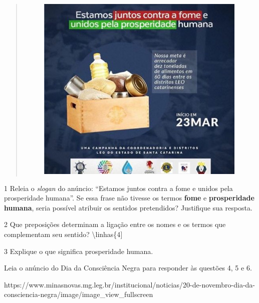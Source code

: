 \begin{itemize}
\begin{itemize}
\begin{quote}
\begin{figure}
\centering
\includegraphics[width=3.95833in,height=3.54167in]{./_SAEB_9_POR/media/image31.jpeg}
\caption{}
\end{figure}
\end{quote}

\num{1} Releia o \emph{slogan} do anúncio: ``Estamos juntos contra a
fome e unidos pela prosperidade humana''. Se essa frase não tivesse os
termos \textbf{fome} e \textbf{prosperidade humana}, seria possível
atribuir os sentidos pretendidos? Justifique sua resposta. 

\num{2} Que preposições determinam a ligação entre os nomes e os termos
que complementam seu sentido? \textbackslash{}linhas\{4{]}

\num{3} Explique o que significa prosperidade humana. 

Leia o anúncio do Dia da Consciência Negra para responder às questões 4,
5 e 6.

https://www.minasnovas.mg.leg.br/institucional/noticias/20-de-novembro-dia-da-consciencia-negra/image/image\_view\_fullscreen


\end{itemize}
\end{itemize}
